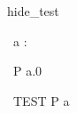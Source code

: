 \begin{zsection}
   \SECTION hide\_test
\end{zsection}

\begin{circus}
  \circchannel\ a : \nat
\end{circus}

\begin{circus}
  \circprocess\ P \circdef \circbegin \circspot a.0 \then \Skip \circend
\end{circus}

\begin{circus}
  \circprocess\ TEST \circdef P \circhide \lchanset a \rchanset
\end{circus}
